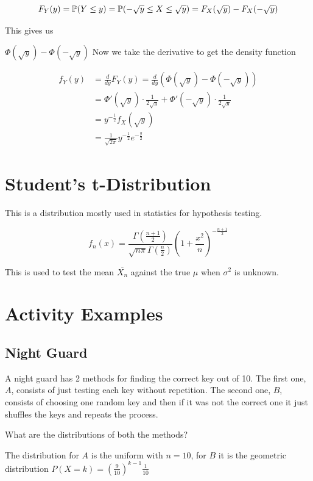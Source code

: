 \[
    F_Y(y) = \mathbb{P}(Y \le y) = \mathbb{P}(-\sqrt{y} \le X \le \sqrt{y}) = F_X(\sqrt{y}) - F_X(-\sqrt{y})
\]

This gives us 

\(\Phi(\sqrt{y}) - \Phi(-\sqrt{y})\) Now we take the derivative to get the density function

\begin{align*}
    f_Y(y) &= \frac{d}{dy} F_Y(y) = \frac{d}{dy} \left( \Phi(\sqrt{y}) - \Phi(-\sqrt{y}) \right) \\ 
           &= \Phi'(\sqrt{y}) \cdot \frac{1}{2\sqrt{y}} + \Phi'(-\sqrt{y}) \cdot \frac{1}{2\sqrt{y}} \\
           &= y^{-\frac{1}{2}} f_X(\sqrt{y})  \\ 
           &= \frac{1}{\sqrt{2\pi}} y^{-\frac{1}{2}} e^{-\frac{y}{2}}
\end{align*}


\section{Student's t-Distribution}

This is a distribution mostly used in statistics for hypothesis testing.

\[
    f_n(x) = \frac{\Gamma \left(\frac{n + 1}{2}\right)}{\sqrt{n \pi} \Gamma \left(\frac{n}{2}\right)} \left(1 + \frac{x^2}{n}\right)^{- \frac{n + 1}{2}}
\]

This is used to test the mean \(\overline{X_n}\) against the true \(\mu\) when \(\sigma^2\) is unknown.

\section{Activity Examples}

\subsection{Night Guard}

A night guard has 2 methods for finding the correct key out of 10. The first one, \(A\), consists of 
just testing each key without repetition. The second one, \(B\), consists of choosing one random key and then 
if it was not the correct one it just shuffles the keys and repeats the process. 

What are the distributions of both the methods? 

The distribution for \(A\) is the uniform with \(n = 10\), for \(B\) it is the geometric distribution \(P(X = k) = \left(\frac{9}{10}\right)^{k - 1} \frac{1}{10}\)


